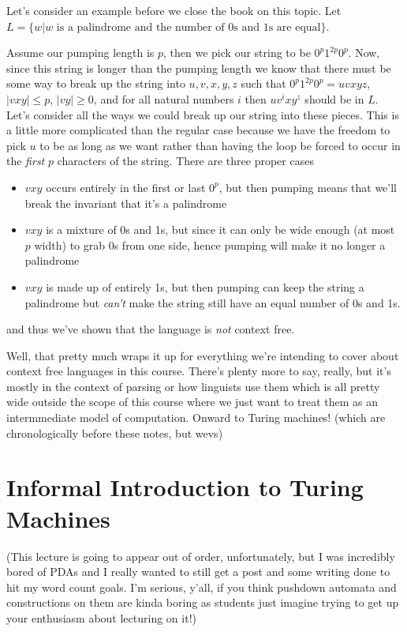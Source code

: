 \documentclass[11pt]{article}
\begin{document}
Let's consider an example before we close the book on this topic. Let $L = \{ w | w \text{ is a palindrome and the number of 0s and 1s are equal}\}$.

Assume our pumping length is $p$, then we pick our string to be $0^p1^{2p}0^p$. Now, since this string is longer than the pumping length we know that there must be some way to break up the string into $u,v,x,y,z$ such that $0^p1^{2p}0^p = uvxyz$, $|vxy| \le p$, $|vy| \ge 0$, and for all natural numbers $i$ then $uv^ixy^z$ should be in $L$. Let's consider all the ways we could break up our string into these pieces. This is a little more complicated than the regular case because we have the freedom to pick $u$ to be as long as we want rather than having the loop be forced to occur in the \emph{first} $p$ characters of the string. There are three proper cases

\begin{itemize}
\item $vxy$ occurs entirely in the first or last $0^p$, but then pumping means that we'll break the invariant that it's a palindrome
\item $vxy$ is a mixture of 0s and 1s, but since it can only be wide enough (at most $p$ width) to grab 0s from one side, hence pumping will make it no longer a palindrome
\item $vxy$ is made up of entirely 1s, but then pumping can keep the string a palindrome but \emph{can't} make the string still have an equal number of 0s and 1s.
\end{itemize}

and thus we've shown that the language is \emph{not} context free.

Well, that pretty much wraps it up for everything we're intending to cover about context free languages in this course. There's plenty more to say, really, but it's mostly in the context of parsing or how linguists use them which is all pretty wide outside the scope of this course where we just want to treat them as an intermmediate model of computation. Onward to Turing machines! (which are chronologically before these notes, but wevs)
\section{Informal Introduction to Turing Machines}
\label{sec-9}
(This lecture is going to appear out of order, unfortunately, but I was incredibly bored of PDAs and I really wanted to still get a post and some writing done to hit my word count goals. I'm serious, y'all, if you think pushdown automata and constructions on them are kinda boring as students just imagine trying to get up your enthusiasm about lecturing on it!)
\end{document}
